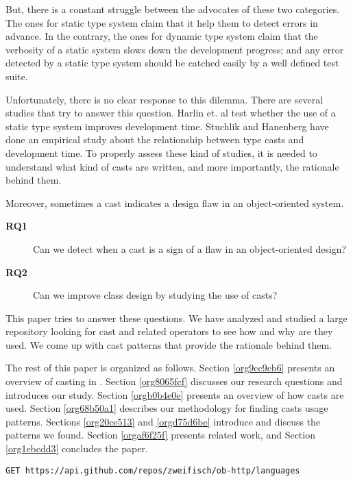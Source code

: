 But, there is a constant struggle between the advocates of these two categories. 
The ones for static type system claim that it help them to detect errors in advance. 
In the contrary, the ones for dynamic type system claim that the verbosity of a static system slows down the development progress; and any error detected by a static type system should be catched easily by a well defined test suite. 

Unfortunately, there is no clear response to this dilemma. 
There are several studies that try to answer this question. 
Harlin et. al \cite{harlin_impact_2017} test whether the use of a static type system improves development time. 
Stuchlik and Hanenberg \cite{stuchlik_static_2011} have done an empirical study about the relationship between type casts and development time. 
To properly assess these kind of studies, it is needed to understand what kind of casts are written, and more importantly, the rationale behind them. 

Moreover, sometimes a cast indicates a design flaw in an object-oriented system. 
\begin{description}
\item[{\textbf{RQ1}}] Can we detect when a cast is a sign of a flaw in an object-oriented design?
\item[{\textbf{RQ2}}] Can we improve class design by studying the use of casts?
\end{description}

This paper tries to answer these questions. 
We have analyzed and studied a large \java{} repository looking for cast and related operators to see how and why are they used. 
We come up with cast patterns that provide the rationale behind them. 

The rest of this paper is organized as follows. 
Section \ref{org9cc9cb6} presents an overview of casting in \java{}. 
Section \ref{org8065fcf} discusses our research questions and introduces our study. 
Section \ref{orgb0b4e0e} presents an overview of how casts are used. 
Section \ref{org68b50a1} describes our methodology for finding casts usage patterns. 
Sections \ref{org20ce513} and \ref{orgd75d6be} introduce and discuss the patterns we found. 
Section \ref{orgaf6f25f} presents related work, and Section \ref{org1ebcdd3} concludes the paper. 

\lstset{language=http,label= ,caption= ,captionpos=b,numbers=none}
\begin{lstlisting}
GET https://api.github.com/repos/zweifisch/ob-http/languages
\end{lstlisting}

